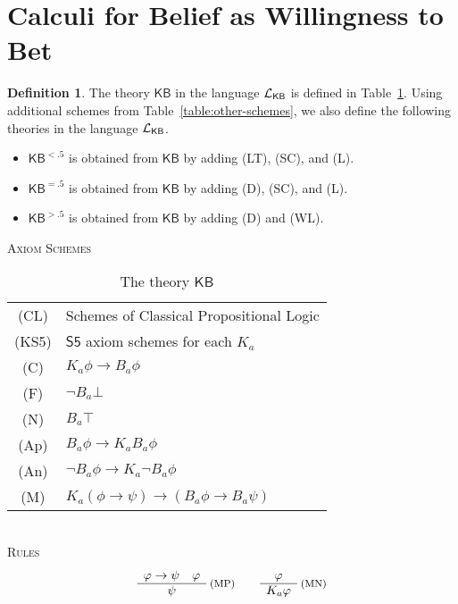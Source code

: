 \documentclass[12pt]{article}
\theoremstyle{definition}
\newtheorem{definition}[theorem]{Definition}
\newcommand{\Lang}{{\cal L}}   %
\newcommand{\KB}{{\mathsf{KB}}}                     %
\newcommand{\KBlt}{{\mathsf{KB}^{\mathsf{<.5}}}}    %
\newcommand{\KBeq}{{\mathsf{KB}^{\mathsf{=.5}}}}    %
\newcommand{\KBgt}{{\mathsf{KB}^{\mathsf{>.5}}}}    %
\begin{document}
\section{Calculi for Belief as Willingness to Bet}

\begin{definition}
  The theory $\KB$ in the language $\Lang_\KB$ is defined in
  Table~\ref{table:KB}.  Using additional schemes from
  Table~\ref{table:other-schemes}, we also define the following
  theories in the language $\Lang_\KB$.
  \begin{itemize}
  \item $\KBlt$ is obtained from $\KB$ by adding (LT), (SC), and (L).

  \item $\KBeq$ is obtained from $\KB$ by adding (D), (SC), and (L).

  \item $\KBgt$ is obtained from $\KB$ by adding (D) and (WL).
  \end{itemize}
\end{definition}

\begin{table}[h]
  \begin{center}
    \textsc{Axiom Schemes}\\[.4em]
    \renewcommand{\arraystretch}{1.3}
    \begin{tabular}[t]{cl}
      (CL) &
      Schemes of Classical Propositional Logic
      \\
      (KS5) &
      $\mathsf{S5}$ axiom schemes for each $K_a$
      \\
      (C) &
      $K_a\phi\to B_a\phi$
      \\
      (F) &
      $\lnot B_a\bot$
      \\
      (N) &
      $B_a\top$
      \\
      (Ap) &
      $B_a\phi\to K_aB_a\phi$
      \\
      (An) &
      $\lnot B_a\phi\to K_a\lnot B_a\phi$
      \\
      (M) &
      $K_a(\phi\to\psi)\to(B_a\phi\to B_a\psi)$
    \end{tabular}
    \renewcommand{\arraystretch}{1.0}
    \\[1em]
    \textsc{Rules}\vspace{-.5em}
    \[
    \begin{array}{c}
      \varphi\to\psi \quad \varphi
      \\\hline
      \psi
    \end{array}\;\text{\footnotesize(MP)}
    \qquad
    \begin{array}{c}
      \varphi
      \\\hline
      K_a\varphi
    \end{array}\;\text{\footnotesize(MN)}
    \]
  \end{center}
  \caption{The theory $\KB$}
  \label{table:KB}
\end{table}
\end{document}
